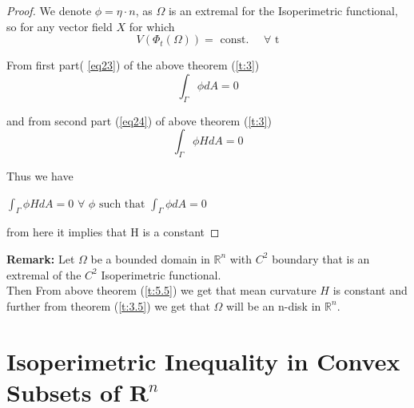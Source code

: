 \documentclass[oneside]{book}
\begin{document}
		
		
		
		
		
		
		\begin{proof} 
			
			
			
			We denote 
			$\phi = \eta\cdot{n}$,
			as $\Omega$ is an extremal for the Isoperimetric functional, so for any vector field $X$ for which
			\[
			V\left(\Phi_{t}(\Omega)\right)=\text { const. } \quad \forall \text{ t}
			\]
			
			From first part( \ref{eq23}) of the above theorem (\ref{t:3}) \\ 
			
			$$\int_{\Gamma} \phi d A=0$$
			
			
			and from second part (\ref{eq24}) of above theorem (\ref{t:3})
			$$\int_{\Gamma} \phi H d A=0$$
			
			Thus we have \\
			
			\begin{center}
				$ \int_{\Gamma} \phi H d A=0 \hspace{4pt} \forall  \hspace{4pt}\phi \text { such that } \int_{\Gamma} \phi d A=0$ \\ 
			\end{center}
			from here it implies that H is a constant 
		\end{proof}
		
		
		\textbf{Remark: }Let $\Omega$ be a bounded domain in $\mathbb{R}^{n}$ with $C^{2}$ boundary that is an extremal of the $C^{2}$ Isoperimetric functional.\\
		Then
		From above theorem (\ref{t:5.5}) we get that mean curvature $H$ is constant and further from theorem (\ref{t:3.5})    we get that $\Omega$ will be an n-disk in $\mathbb{R}^n$.
		
		
		
		
		

		
		
		
		
	    \chapter{Isoperimetric Inequality in Convex Subsets of $\mathbf{R}^{n}$ }
	
	\label{chap:c4}
	
	
\end{document}
